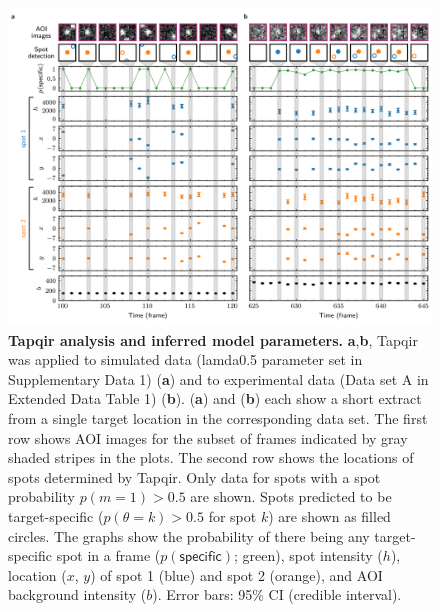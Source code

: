\begin{figure}[h]
\centering
\includegraphics[width=\textwidth]{figures/figure3.png}
\caption{\textbf{Tapqir analysis and inferred model parameters.} \textbf{a},\textbf{b}, Tapqir was applied to simulated data (lamda0.5 parameter set in Supplementary Data 1) (\textbf{a}) and to experimental data (Data set A in Extended Data Table 1) (\textbf{b}). (\textbf{a}) and (\textbf{b}) each show a short extract from a single target location in the corresponding data set. The first row shows AOI images for the subset of frames indicated by gray shaded stripes in the plots. The second row shows the locations of spots determined by Tapqir. Only data for spots with a spot probability $p(m=1) > 0.5$ are shown. Spots predicted to be target-specific ($p(\theta=k)>0.5$ for spot $k$) are shown as filled circles. The graphs show the probability of there being any target-specific spot in a frame ($p(\mathsf{specific})$; green), spot intensity ($h$), location ($x$, $y$) of spot 1 (blue) and spot 2 (orange), and AOI background intensity ($b$). Error bars: 95\% CI (credible interval).  }
\label{fig:tapqir_analysis}
\end{figure}

